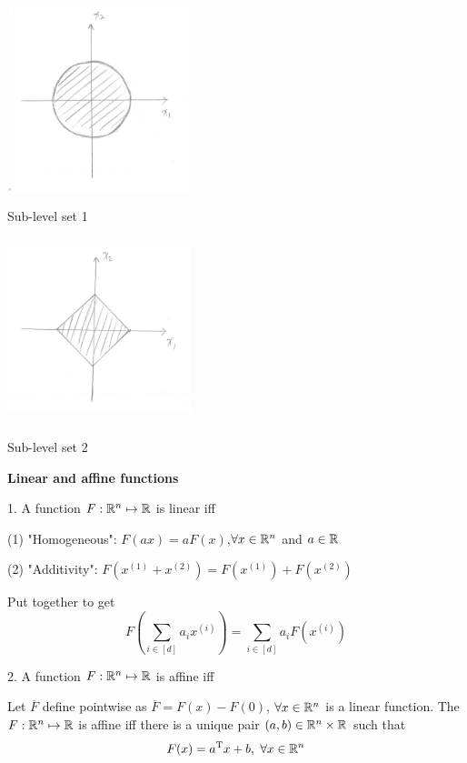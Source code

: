 \begin{marginfigure}
	\centering
	\includegraphics[width=2.1in,height=2.1in]{figures/ch02/p48-7.jpg}
	\caption{Sub-level set 1} 
\end{marginfigure}

\begin{marginfigure}
	\centering
	\includegraphics[width=2.1in,height=2.1in]{figures/ch02/p48-8.jpg}
	\caption{Sub-level set 2} 
\end{marginfigure}

\vspace{0.5cm}
\textbf{Linear and affine functions}

1. A function $F:\mathbb{R}^{n}\mapsto\mathbb{R}$ is linear iff

(1) "Homogeneous": $F(ax)=aF(x)$,$ \forall x\in\mathbb{R}^{n}$ and $a\in\mathbb{R}$

(2) "Additivity":  $F(x^{(1)}+x^{(2)})=F(x^{(1)})+F(x^{(2)})$

Put together to get 
$$F(\sum_{i\in [d]}^{}a_{i}x^{(i)})=\sum_{i\in [d]}^{}a_{i}F(x^{(i)})$$

\vspace{0.3cm}
2. A function $F:\mathbb{R}^{n}\mapsto\mathbb{R}$ is affine iff

Let $\overline{F}$ define pointwise as $\overline{F}=F(x)-F(0)$, $\forall x\in\mathbb{R}^{n}$ is a linear function. The $F:\mathbb{R}^{n}\mapsto\mathbb{R}$ is affine iff there is a unique pair $(a,b)\in\mathbb{R}^{n}\times\mathbb{R}$ such that 
$$F(x)=a^{{\rm T}} x+b,\  \forall x\in\mathbb{R}^{n}$$

